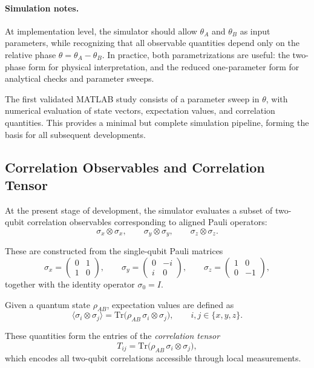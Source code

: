 \documentclass[a4paper]{article}
\begin{document}
\paragraph{Simulation notes.}
At implementation level, the simulator should allow \(\theta_A\) and \(\theta_B\) as input parameters, while recognizing that all observable quantities depend only on the relative phase \(\theta=\theta_A-\theta_B\). In practice, both parametrizations are useful: the two-phase form for physical interpretation, and the reduced one-parameter form for analytical checks and parameter sweeps.

The first validated MATLAB study consists of a parameter sweep in \(\theta\), with numerical evaluation of state vectors, expectation values, and correlation quantities. This provides a minimal but complete simulation pipeline, forming the basis for all subsequent developments.

\subsection{Correlation Observables and Correlation Tensor}

At the present stage of development, the simulator evaluates a subset of two-qubit correlation observables corresponding to aligned Pauli operators:
\[
\sigma_x \otimes \sigma_x,\qquad
\sigma_y \otimes \sigma_y,\qquad
\sigma_z \otimes \sigma_z.
\]

These are constructed from the single-qubit Pauli matrices
\[
\sigma_x=
\begin{pmatrix}
0 & 1\\
1 & 0
\end{pmatrix},
\qquad
\sigma_y=
\begin{pmatrix}
0 & -i\\
i & 0
\end{pmatrix},
\qquad
\sigma_z=
\begin{pmatrix}
1 & 0\\
0 & -1
\end{pmatrix},
\]
together with the identity operator \(\sigma_0 = I\).

\medskip

Given a quantum state \(\rho_{AB}\), expectation values are defined as
\[
\langle \sigma_i \otimes \sigma_j \rangle
=
\mathrm{Tr}\bigl(\rho_{AB}\, \sigma_i \otimes \sigma_j\bigr),
\qquad i,j \in \{x,y,z\}.
\]

These quantities form the entries of the \emph{correlation tensor}
\[
T_{ij} = \mathrm{Tr}\bigl(\rho_{AB}\, \sigma_i \otimes \sigma_j\bigr),
\]
which encodes all two-qubit correlations accessible through local measurements.
\end{document}

